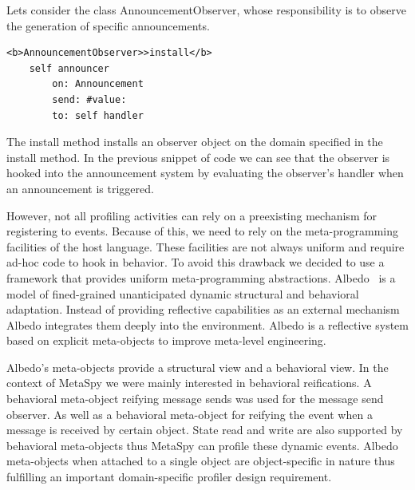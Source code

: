 \documentclass[runningheads]{llncs}
\newcommand{\project}{{\sc MetaSpy}\xspace}
\newcommand{\co}[1]{{\sf #1}}
\begin{document}
Lets consider the class \co{AnnouncementObserver}, whose responsibility is to observe the generation of specific announcements.

\begin{lstlisting}
<b>AnnouncementObserver>>install</b>
    self announcer 
        on: Announcement 
        send: #value: 
        to: self handler
\end{lstlisting}

The \co{install} method installs an observer object on the domain specified in the \co{install} method. In the previous snippet of code we can see that the observer is hooked into the announcement system by evaluating the observer's handler when an announcement is triggered.

However, not all profiling activities can rely on a preexisting mechanism for registering to events. Because of this, we need to rely on the meta-programming facilities of the host language.
These facilities are not always uniform and require ad-hoc code to hook in behavior.
To avoid this drawback we decided to use a framework that provides uniform meta-programming abstractions.
Albedo~\cite{Ress10a} is a model of fined-grained unanticipated dynamic structural and behavioral adaptation. Instead of providing reflective capabilities as an external mechanism Albedo integrates them deeply into the environment. 
Albedo is a reflective system based on explicit meta-objects to improve meta-level engineering.



Albedo's meta-objects provide a structural view and a behavioral view. In the context of \project we were mainly interested in behavioral reifications. A behavioral meta-object reifying message sends was used for the message send observer. As well as a behavioral meta-object for reifying the event when a message is received by certain object. State read and write are also supported by behavioral meta-objects thus \project can profile these dynamic events.
Albedo meta-objects when attached to a single object are object-specific in nature thus fulfilling an important domain-specific profiler design requirement.
\end{document}
